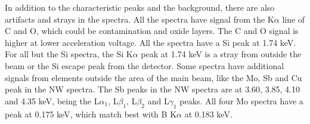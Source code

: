 In addition to the characteristic peaks and the background, there are also artifacts and strays in the spectra. %
All the spectra have signal from the K$\alpha$ line of C and O, which could be contamination and oxide layers. %
The C and O signal is higher at lower acceleration voltage.
All the spectra have a Si peak at 1.74 keV. %
For all but the Si spectra, the Si K$\alpha$ peak at 1.74 keV is a stray from outside the beam or the Si escape peak from the detector.
Some spectra have additional signals from elements outside the area of the main beam, like the Mo, Sb and Cu peak in the NW spectra. %
The Sb peaks in the NW spectra are at 3.60, 3.85, 4.10 and 4.35 keV, being the L$\alpha_1$, L$\beta_1$, L$\beta_2$ and L$\gamma_1$ peaks.
All four Mo spectra have a peak at 0.175 keV, which match best with B K$\alpha$ at 0.183 keV.





